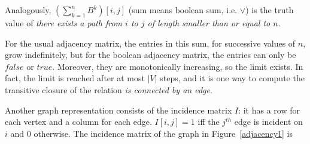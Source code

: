 Analogously, $(\sum_{k=1}^{n} B^{k})[i,j]$ (sum means boolean sum,
i.e. $\vee$) is the truth value of {\em there exists a path from $i$
to $j$ of length smaller than or equal to $n$}.

For the usual adjacency matrix, the entries in this sum, for
successive values of $n$, grow indefinitely, but for the boolean
adjacency matrix, the entries can only be $false$ or $true$. Moreover,
they are monotonically increasing, so the limit exists. In fact, the
limit is reached after at most $|V|$ steps, and it is one way to
compute the transitive closure of the relation {\em is connected by an
edge}.

Another graph representation consists of the incidence matrix $I$: it
has a row for each vertex and a column for each edge. $I[i,j] = 1$
iff the $j^{th}$ edge is incident on $i$ and 0 otherwise.  The
incidence matrix of the graph in Figure~\ref{adjacency1} is


